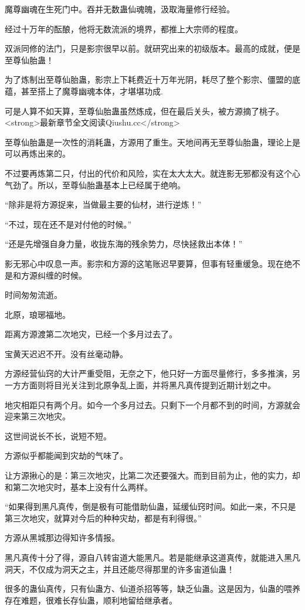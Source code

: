 \begin{this_body}
魔尊幽魂在生死门中。吞并无数蛊仙魂魄，汲取海量修行经验。

经过十万年的酝酿，他将无数流派的境界，都推上大宗师的程度。

双派同修的法门，只是影宗很早以前。就研究出来的初级版本。最高的成就，便是至尊仙胎蛊！

为了炼制出至尊仙胎蛊，影宗上下耗费近十万年光阴，耗尽了整个影宗、僵盟的底蕴，甚至搭上了魔尊幽魂本体，才堪堪功成.

可是人算不如天算，至尊仙胎蛊虽然炼成，但在最后关头，被方源摘了桃子。<strong>最新章节全文阅读Qiushu.cc</strong>

至尊仙胎蛊是一次性的消耗蛊，方源用了重生。天地间再无至尊仙胎蛊，理论上是可以再炼出来的。

不过要再炼第二只，付出的代价和风险，实在太大太大。就连影无邪都没有这个心气劲了。所以，至尊仙胎蛊基本上已经属于绝响。

“除非是将方源捉来，当做最主要的仙材，进行逆炼！”

“不过，现在还不是对付他的时候。”

“还是先增强自身力量，收拢东海的残余势力，尽快拯救出本体！”

影无邪心中叹息一声。影宗和方源的这笔账迟早要算，但事有轻重缓急。现在绝不是和方源纠缠的时候。

时间匆匆流逝。

北原，琅琊福地。

距离方源渡第二次地灾，已经一个多月过去了。

宝黄天迟迟不开。没有丝毫动静。

方源经营仙窍的大计严重受阻，无奈之下，他只好一方面尽量修行，多多推演，另一方方面则将目光关注到北原争乱上面，并将黑凡真传提到近期计划之中。

地灾相距只有两个月。如今一个多月过去。只剩下一个月都不到的时间，方源就会迎来第三次地灾。

这世间说长不长，说短不短。

方源似乎都能闻到灾劫的气味了。

让方源揪心的是：第三次地灾，比第二次还要强大。而到目前为止，他的实力，却和第二次地灾时，基本上没有什么两样。

“如果得到黑凡真传，倒是极有可能借助仙蛊，延缓仙窍时间。如此一来，不只是第三次地灾，就算对今后的种种灾劫，都是有利得很。”

方源从黑城那边得知许多情报。

黑凡真传十分了得，源自八转宙道大能黑凡。若是能继承这道真传，就能进入黑凡洞天，不仅成为洞天之主，并且还能尽得那里的许多宙道仙蛊！

很多的蛊仙真传，只有仙蛊方、仙道杀招等等，缺乏仙蛊。这是因为，仙蛊的喂养存在难题，很难长存仙蛊，顺利地留给继承者。


\end{this_body}
